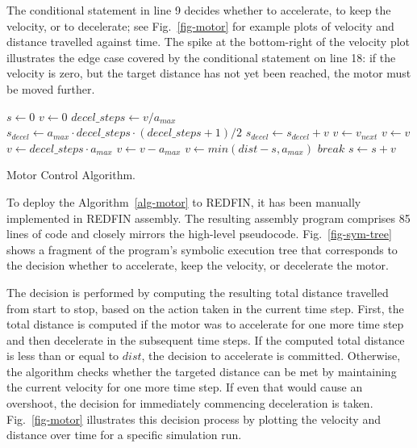 The conditional statement in line 9 decides whether
to accelerate, to keep the velocity, or to decelerate;
see Fig.~\ref{fig-motor} for example plots of velocity and distance travelled
against time. The spike at the bottom-right of the velocity plot illustrates
the edge case covered by the conditional statement on line 18: if the velocity
is zero, but the target distance has not yet been reached, the motor must be
moved further.

\begin{algorithm}[h]
  \begin{algorithmic}[1]
\State $s \gets 0$
\State $v \gets 0$
  \State $decel\_steps\gets v / a_{max}$
  \State $s_{decel} \gets a_{max} \cdot decel\_steps \cdot (decel\_steps + 1) / 2$
    \State $s_{decel} \gets s_{decel} + v$
  \EndIf
    \State $v \gets v_{next}$ 
    \State $ v \gets v $     
  \Else
      \State $v \gets decel\_steps \cdot a_{max}$
    \Else
      \State $v \gets v - a_{max}$
      \EndIf
  \EndIf
      
      \State $v \gets min(dist - s, a_{max})$
    \Else
      \State $break$  
      \EndIf
      \EndIf
  \State $s \gets s + v$
\EndWhile
\end{algorithmic}
\caption{Motor Control Algorithm.\label{alg-motor}}
\end{algorithm}

To deploy the Algorithm~\ref{alg-motor} to REDFIN, it has been manually
implemented in REDFIN assembly. The resulting assembly program comprises 85 lines of
code and closely mirrors the high-level pseudocode. Fig.~\ref{fig-sym-tree} shows
a fragment of the program's symbolic execution tree that corresponds to the
decision whether to accelerate, keep the velocity, or decelerate the motor.

The decision is performed by computing the resulting total distance
travelled from start to stop, based on the action taken in the current
time step.  First, the total distance is computed if the motor was to
accelerate for one more time step and then decelerate in the
subsequent time steps.  If the computed total distance is less than or
equal to $dist$, the decision to accelerate is committed.  Otherwise,
the algorithm checks whether the targeted distance can be met by
maintaining the current velocity for one more time step.  If even that
would cause an overshoot, the decision for immediately commencing
deceleration is taken. Fig.~\ref{fig-motor} illustrates this decision process by
plotting the velocity and distance over time for a specific simulation
run.


